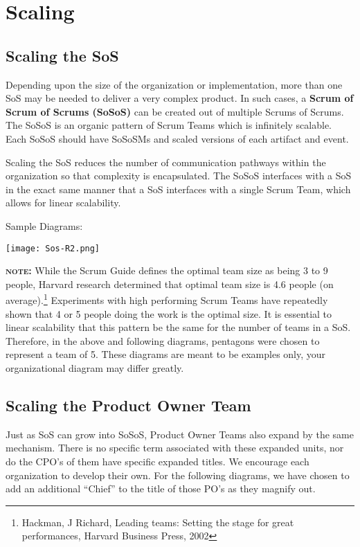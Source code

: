 \documentclass[12pt,a4paper,parskip=full]{scrartcl}
\begin{document}
\section{Scaling}

\subsection{Scaling the SoS}

Depending upon the size of the organization or implementation, more than one SoS may be needed to deliver a very complex product. In such cases, a \textbf{Scrum of Scrum of Scrums (SoSoS)} can be created out of multiple Scrums of Scrums. The SoSoS is an organic pattern of Scrum Teams which is infinitely scalable. Each SoSoS should have SoSoSMs and scaled versions of each artifact and event.

Scaling the SoS reduces the number of communication pathways within the organization so that complexity is encapsulated. The SoSoS interfaces with a SoS in the exact same manner that a SoS interfaces with a single Scrum Team, which allows for linear scalability.

Sample Diagrams:

\texttt{[image: Sos-R2.png]}

\textbf{\textsc{note:}} While the Scrum Guide defines the optimal team size as being 3 to 9 people, Harvard research determined that optimal team size is 4.6 people (on average).\footnote{Hackman, J Richard, Leading teams: Setting the stage for great performances, Harvard Business Press, 2002} Experiments with high performing Scrum Teams have repeatedly shown that 4 or 5 people doing the work is the optimal size. It is essential to linear scalability that this pattern be the same for the number of teams in a SoS. Therefore, in the above and following diagrams, pentagons were chosen to represent a team of 5. These diagrams are meant to be examples only, your organizational diagram may differ greatly.

\subsection{Scaling the Product Owner Team}

Just as SoS can grow into SoSoS, Product Owner Teams also expand by the same mechanism. There is no specific term associated with these expanded units, nor do the CPO's of them have specific expanded titles. We encourage each organization to develop their own. For the following diagrams, we have chosen to add an additional ``Chief'' to the title of those PO's as they magnify out.
\end{document}
